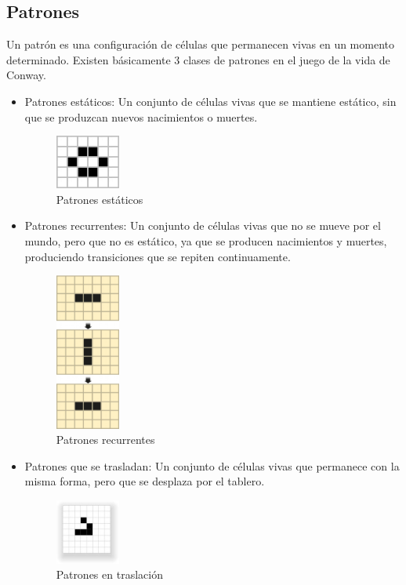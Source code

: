 \documentclass[12pt,a4paper]{book}
\begin{document}
	\subsection{Patrones}
	Un patrón es una configuración de células que permanecen vivas en un momento determinado. Existen
	básicamente 3 clases de patrones en el juego de la vida de Conway.
	\begin{itemize}
		\item Patrones estáticos: Un conjunto de células vivas que se mantiene estático, sin que se produzcan nuevos
		nacimientos o muertes.
		\begin{figure}[H]
			\centering
			\includegraphics[width=0.2\textwidth]{imagen2PC}
			\caption{Patrones estáticos}
		\end{figure}
		\item Patrones recurrentes: Un conjunto de células vivas que no se mueve por el mundo, pero que no es estático,
		ya que se producen nacimientos y muertes, produciendo transiciones que se repiten continuamente.
		\begin{figure}[H]
			\centering
			\includegraphics[width=0.2\textwidth]{imagen3PC}
			\caption{Patrones recurrentes}
		\end{figure}
		\item Patrones que se trasladan: Un conjunto de células vivas que permanece con la misma forma, pero que se
		desplaza por el tablero.
		\begin{figure}[H]
			\centering
			\includegraphics[width=0.2\textwidth]{imagen4PC}
			\caption{Patrones en traslación}
		\end{figure}
	\end{itemize}
\end{document}
